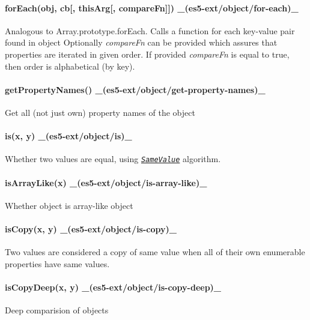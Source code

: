 \paragraph*{for\+Each(obj, cb\mbox{[}, this\+Arg\mbox{[}, compare\+Fn\mbox{]}\mbox{]}) \+\_\+(es5-\/ext/object/for-\/each)\+\_\+}

Analogous to Array.\+prototype.\+for\+Each. Calls a function for each key-\/value pair found in object Optionally {\itshape compare\+Fn} can be provided which assures that properties are iterated in given order. If provided {\itshape compare\+Fn} is equal to {\ttfamily true}, then order is alphabetical (by key).

\paragraph*{get\+Property\+Names() \+\_\+(es5-\/ext/object/get-\/property-\/names)\+\_\+}

Get all (not just own) property names of the object

\paragraph*{is(x, y) \+\_\+(es5-\/ext/object/is)\+\_\+}

Whether two values are equal, using \href{http://people.mozilla.org/~jorendorff/es6-draft.html#sec-samevaluezero}{\tt {\itshape Same\+Value}} algorithm.

\paragraph*{is\+Array\+Like(x) \+\_\+(es5-\/ext/object/is-\/array-\/like)\+\_\+}

Whether object is array-\/like object

\paragraph*{is\+Copy(x, y) \+\_\+(es5-\/ext/object/is-\/copy)\+\_\+}

Two values are considered a copy of same value when all of their own enumerable properties have same values.

\paragraph*{is\+Copy\+Deep(x, y) \+\_\+(es5-\/ext/object/is-\/copy-\/deep)\+\_\+}

Deep comparision of objects

